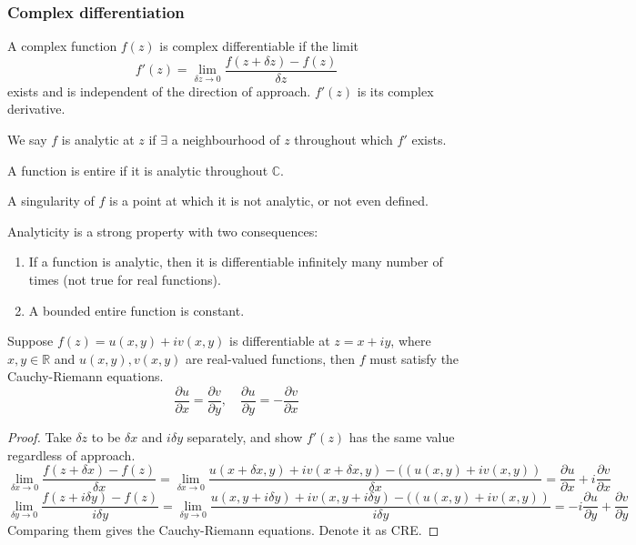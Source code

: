 \documentclass[a4paper]{article}
\begin{document}
\subsubsection{Complex differentiation}
\begin{defi}
A complex function $f(z)$ is complex differentiable if the limit
\begin{equation}
f'(z)=\lim_{\delta z\rightarrow 0}\frac{f(z+\delta z)-f(z)}{\delta z}\tag{6.4}
\end{equation}
exists and is independent of the direction of approach. $f'(z)$ is its complex derivative.
\end{defi}
\begin{defi}[Analytic]
We say $f$ is analytic at $z$ if $\exists$ a neighbourhood of $z$ throughout which $f'$ exists.
\end{defi}
\begin{defi}[Entire]
A function is entire if it is analytic throughout $\mathbb{C}$.
\end{defi}
\begin{defi}[Singularity]
A singularity of $f$ is a point at which it is not analytic, or not even defined.
\end{defi}
\begin{remarks}
Analyticity is a strong property with two consequences:
\begin{enumerate}
    \item If a function is analytic, then it is differentiable infinitely many number of times (not true for real functions).
    \item A bounded entire function is constant.
\end{enumerate}
\end{remarks}
\begin{prop}
Suppose $f(z)=u(x,y)+iv(x,y)$ is differentiable at $z=x+iy$, where $x,y\in\mathbb{R}$ and $u(x,y),v(x,y)$ are real-valued functions, then $f$ must satisfy the Cauchy-Riemann equations.
\begin{equation}
\frac{\partial u}{\partial x}=\frac{\partial v}{\partial y},\quad\frac{\partial u}{\partial y}=-\frac{\partial v}{\partial x}\tag{6.5}
\end{equation}
\end{prop}
\begin{proof}
Take $\delta z$ to be $\delta x$ and $i\delta y$ separately, and show $f'(z)$ has the same value regardless of approach.
$$\lim_{\delta x\rightarrow0}\frac{f(z+\delta x)-f(z)}{\delta x}=\lim_{\delta x\rightarrow 0}\frac{u(x+\delta x,y)+iv(x+\delta x,y)-((u(x,y)+iv(x,y))}{\delta x}=\frac{\partial u}{\partial x}+i\frac{\partial v}{\partial x}$$
$$\lim_{\delta y\rightarrow0}\frac{f(z+i\delta y)-f(z)}{i\delta y}=\lim_{\delta y\rightarrow 0}\frac{u(x,y+i\delta y)+iv(x,y+i\delta y)-((u(x,y)+iv(x,y))}{i\delta y}=-i\frac{\partial u}{\partial y}+\frac{\partial v}{\partial y}$$
Comparing them gives the Cauchy-Riemann equations. Denote it as CRE.
\end{proof}
\end{document}
